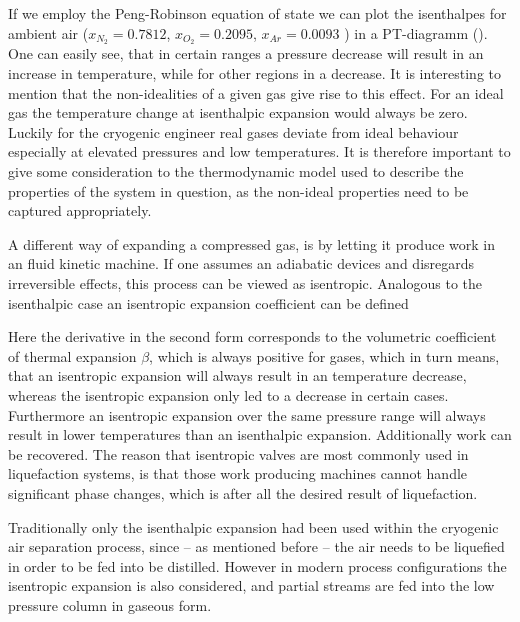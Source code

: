         If we employ the Peng-Robinson equation of state we can plot the isenthalpes for ambient air
        ($x_{N_2}=0.7812$, $x_{O_2}=0.2095$, $x_{Ar}=0.0093$ ) in a PT-diagramm ().
        One can easily see, that in certain ranges a pressure decrease will result in an increase in temperature,
        while for other regions in a decrease. It is interesting to mention that the non-idealities
        of a given gas give rise to this effect. For an ideal gas the temperature change at isenthalpic
        expansion would always be zero. Luckily for the cryogenic engineer real gases deviate from ideal
        behaviour especially at elevated pressures and low temperatures. It is therefore important to give some
        consideration to the thermodynamic model used to describe the properties of the system in question, as the
        non-ideal properties need to be captured appropriately.

        A different way of expanding a compressed gas, is by letting it produce work in an fluid kinetic machine.
        If one assumes an adiabatic devices and disregards irreversible effects, this process can be viewed as
        isentropic. Analogous to the isenthalpic case an isentropic expansion coefficient can be defined

        Here the derivative in the second form corresponds to the volumetric coefficient of thermal expansion
        $\beta$, which is always positive for gases, which in turn means, that an isentropic expansion
        will always result in an temperature decrease, whereas the isentropic expansion only led to a decrease in
        certain cases. Furthermore an isentropic expansion over the same pressure range will always result in
        lower temperatures than an isenthalpic expansion. Additionally work can be recovered. The reason
        that isentropic valves are most commonly used in liquefaction systems, is that those work producing
        machines cannot handle significant phase changes, which is after all the desired result of liquefaction.

        Traditionally only the isenthalpic expansion had been used within the cryogenic air separation process,
        since -- as mentioned before -- the air needs to be liquefied in order to be fed into be distilled. However
        in modern process configurations the isentropic expansion is also considered, and partial streams are fed into
        the low pressure column in gaseous form.
            



